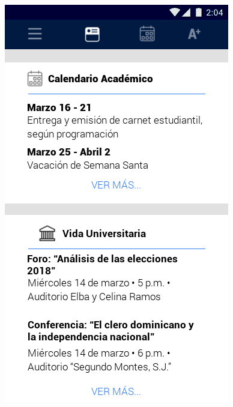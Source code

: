 \documentclass[12pt]{article}
\begin{document}
\begin{figure}[!tbp]
\begin{minipage}[b]{0.45\textwidth}
		\includegraphics[width=\textwidth]{img/3.png}
	\end{minipage}
\end{figure}
\end{document}
